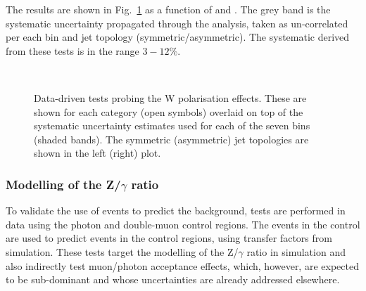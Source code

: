The results are shown in Fig.~\ref{fig:closureMuPToMuM} as a function of \scalht and \njet. 
The grey band is the systematic uncertainty propagated through the analysis, 
taken as un-correlated per each \scalht bin and jet topology (symmetric/asymmetric). The systematic derived from these tests is
in the range $3-12\%$.



\begin{figure}[h!]
  \begin{center}
    ~~
    \caption{Data-driven tests probing the W polarisation effects. 
      These are shown for each
      \njet category (open symbols) overlaid on top of the systematic
      uncertainty estimates used for each of the seven \scalht bins
      (shaded bands). 
      The symmetric (asymmetric) jet topologies are shown in the left (right) plot.       
    }
    \label{fig:closureMuPToMuM}
  \end{center} 
\end{figure}



\subsubsection*{Modelling of the Z/$\gamma$ ratio}
\label{sec:tfSyst_ZGratio}
To validate the use of \gj events to predict the \znunu
background, tests are performed in data using the photon and double-muon control regions. 
The events in the \gj control are used to predict events in the \mmj control regions, 
using transfer factors from simulation. 
These tests target the modelling of the Z/$\gamma$ ratio in simulation and 
also indirectly test muon/photon acceptance effects, which, however, 
are expected to be sub-dominant and whose uncertainties are already addressed elsewhere. 

